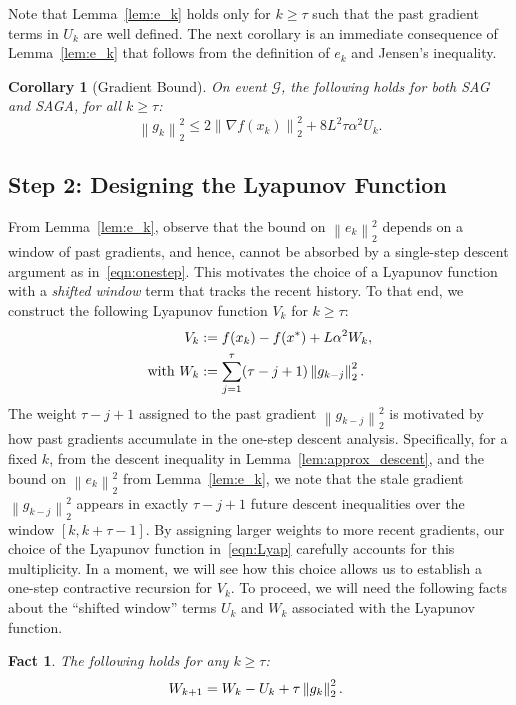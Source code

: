 \documentclass{article}
\theoremstyle{plain}
\newtheorem{fact}[theorem]{Fact}
\newtheorem{corollary}[theorem]{Corollary}
\theoremstyle{definition}
\newcommand{\cG}{\mathcal{G}}
\newcommand{\norm}[1]{\left\| #1\right\|_{2}}
\begin{document}
Note that Lemma~\ref{lem:e_k} holds only for $k\geq\tau$ such that the past gradient terms in $U_k$ are well defined. The next corollary is an immediate consequence of Lemma~\ref{lem:e_k} that follows from the definition of $e_k$ and Jensen's inequality. 
\begin{corollary}[Gradient Bound]\label{coro}
On event $\cG$, the following holds for both SAG and SAGA, for all $k\geq \tau$:
\begin{equation}
    \norm{g_k}^2\leq 2\norm{\nabla f(x_k)}^2 + 8L^2\tau\alpha^2 U_k.
\end{equation}
\end{corollary}

\subsection{Step 2: Designing the Lyapunov Function}
\label{subsec:Lyap}
From Lemma~\ref{lem:e_k}, observe that the bound on $\norm{e_k}^2$ depends on a window of past gradients, and hence, cannot be absorbed by a single-step descent argument as in~\eqref{eqn:onestep}. This motivates the choice of a Lyapunov function with a \textit{shifted window} term that tracks the recent history. To that end, we construct the following Lyapunov function $V_k$ for $k\geq \tau$: 
\begin{equation}
\label{eqn:Lyap}
\begin{aligned}
    V_k&:=f(x_k)-f(x^*)+L\alpha^2W_k,\\
    \textup{with } W_k&:=\sum_{j=1}^\tau (\tau-j+1)\norm{g_{k-j}}^2.
\end{aligned}
\end{equation}
The weight $\tau-j+1$ assigned to the past gradient $\norm{g_{k-j}}^2$ is motivated by {how past gradients accumulate} in the one-step descent analysis. Specifically, for a fixed $k$, from the descent inequality in Lemma~\ref{lem:approx_descent}, and the bound on $\norm{e_k}^2$ from Lemma~\ref{lem:e_k}, we note that the stale gradient $\norm{g_{k-j}}^2$ appears in exactly $\tau-j+1$ future descent inequalities over the window $[k, k+\tau-1]$. By assigning larger weights to more recent gradients, our choice of the Lyapunov function in~\eqref{eqn:Lyap} carefully accounts for this multiplicity. In a moment, we will see how this choice allows us to establish a one-step contractive recursion for $V_k$. To proceed, we will need the following facts about the ``shifted window'' terms $U_k$ and $W_k$ associated with the Lyapunov function.
\begin{fact}\label{fact1}
The following holds for any $k\geq \tau$:
\begin{equation}
    W_{k+1} = W_k - U_k +\tau\norm{g_k}^2. \hspace{2mm} 
\end{equation}
\end{fact}
\end{document}
